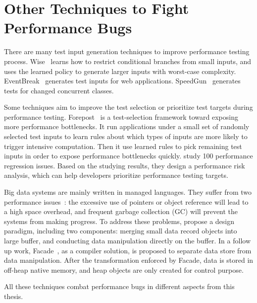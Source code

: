 \section{Other Techniques to Fight Performance Bugs}
\label{sec:2_other}

There are many test input generation techniques to improve performance testing process. 
Wise~\citep{WISE} learns how to restrict conditional branches from small inputs, 
and uses the learned policy to generate larger inputs with worst-case complexity. 
EventBreak~\citep{EventBreak} generates test inputs for web applications. 
SpeedGun~\citep{SpeedGun} generates tests for changed concurrent classes.

Some techniques aim to improve the test selection or prioritize test targets during performance testing. 
Forepost~\citep{Forepost} is a test-selection framework toward exposing more performance bottlenecks. 
It run applications under a small set of randomly selected test inputs to learn rules 
about which types of inputs are more likely to trigger intensive computation. 
Then it use learned rules to pick remaining test inputs in order to expose performance bottlenecks quickly. 
\citet{HuangRegression} study 100 performance regression issues. 
Based on the studying results, 
they design a performance risk analysis, which can help developers prioritize performance testing targets.  


Big data systems are mainly written in managed languages. 
They suffer from two performance issues~\citep{HarryISMM,FACADE}: 
the excessive use of pointers or object reference will lead to a high space overhead, 
and frequent garbage collection (GC) will prevent the systems from making progress. 
To address these problems, \citet{HarryISMM} propose a design paradigm, 
including two components: 
merging small data record objects into large buffer, 
and conducting data manipulation directly on the buffer. 
In a follow up work, Facade~\citep{FACADE}, 
as a compiler solution, 
is proposed to separate data store from data manipulation. 
After the transformation enforced by Facade, 
data is stored in off-heap native memory, 
and heap objects are only created for control purpose. 

All these techniques combat performance bugs in different aspects from this thesis.
